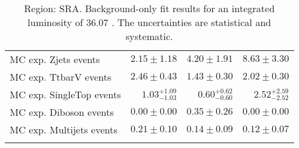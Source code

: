 \begin{table}
\begin{center}
{\begin{tabular*}{\textwidth}{@{\extracolsep{\fill}}lrrr}
        MC exp. Zjets events         & $2.15 \pm 1.18$          & $4.20 \pm 1.91$          & $8.63 \pm 3.30$              \\
        MC exp. TtbarV events         & $2.46 \pm 0.43$          & $1.43 \pm 0.30$          & $2.02 \pm 0.30$              \\
        MC exp. SingleTop events         & $1.03_{-1.03}^{+1.09}$          & $0.60_{-0.60}^{+0.62}$          & $2.52_{-2.52}^{+2.59}$              \\
        MC exp. Diboson events         & $0.00 \pm 0.00$          & $0.35 \pm 0.26$          & $0.00 \pm 0.00$              \\
        MC exp. Multijets events         & $0.21 \pm 0.10$          & $0.14 \pm 0.09$          & $0.12 \pm 0.07$              \\
\noalign{\smallskip}\hline\noalign{\smallskip}
\end{tabular*}
}
\end{center}
\caption{Region: SRA. Background-only fit results for an integrated luminosity of 36.07 \ifb. The uncertainties are statistical and systematic.
}
\label{table.bkgonly.SRA}
\end{table}
%